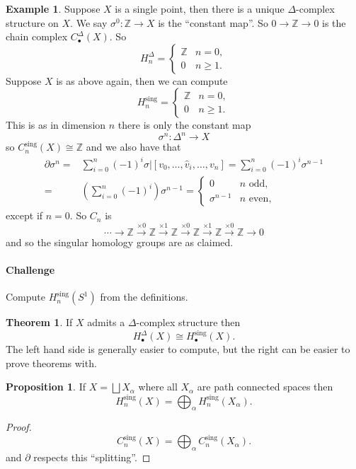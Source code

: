 \documentclass[12pt]{article}
\theoremstyle{definition}
\newtheorem*{thm}{Theorem}
\newtheorem*{prop}{Proposition}
\theoremstyle{definition}
\newtheorem*{ex}{Example}
\newcommand{\ZZ}{\mathbb{Z}}
\newcommand{\C}{C_\bullet}
\renewcommand{\H}{H_\bullet}
\begin{document}
\begin{ex}
Suppose $X$ is a single point, then there is a unique $\Delta$-complex structure on $X$.
We say $\sigma^0\colon \ZZ \to X$ is the ``constant map''.
So $0 \to \ZZ \to 0$ is the chain complex $\C^\Delta(X)$.
So
\[
H_n^\Delta =\begin{cases}\ZZ &n=0,\\
0 &n\ge 1.
\end{cases} 
\]
Suppose $X$ is as above again, then we can compute
\[
H_n^\text{sing} =\begin{cases}\ZZ &n=0,\\
0 &n\ge 1.
\end{cases}
\]
This is as in dimension $n$ there is only the constant map
\[
\sigma^n \colon \Delta^n \to X
\]
so $C_n^\text{sing}(X) \cong \ZZ$ and we also have that
\begin{align*}
\partial \sigma^n =& \sum_{i=0}^{n} (-1)^i \sigma|[v_0,\ldots,\hat v_i,\ldots,v_n] = \sum_{i=0}^{n} (-1)^i \sigma^{n-1}\\
=& \left(\sum_{i=0}^{n} (-1)^i\right)\sigma^{n-1} =\begin{cases}
0 &n\text{ odd},\\
\sigma^{n-1} &n\text{ even},
\end{cases}
\end{align*}
except if $n=0$.
So $C_n$ is 
\[
\cdots\to \ZZ \xrightarrow{\times 0}\ZZ \xrightarrow{\times 1}\ZZ \xrightarrow{\times 0}\ZZ \xrightarrow{\times 1}\ZZ \xrightarrow{\times 0}\ZZ \to 0
\]
and so the singular homology groups are as claimed.
\end{ex}

\paragraph{Challenge} Compute $H_n^\text{sing}(S^1)$ from the definitions.

\begin{thm}
If $X$ admits a $\Delta$-complex structure then 
\[
\H^\Delta(X) \cong \H^\text{sing}(X).
\]
The left hand side is generally easier to compute, but the right can be easier to prove theorems with.
\end{thm}

\begin{prop}
If $X = \bigsqcup X_\alpha$ where all $X_\alpha$ are path connected spaces then 
\[
H_n^\text{sing}(X) = \bigoplus_\alpha H_n^\text{sing}(X_\alpha).
\]
\end{prop}
\begin{proof}
\[
C_n^\text{sing}(X) = \bigoplus_\alpha C_n^\text{sing}(X_\alpha).
\]
and $\partial$ respects this ``splitting''.
\end{proof}
\end{document}
